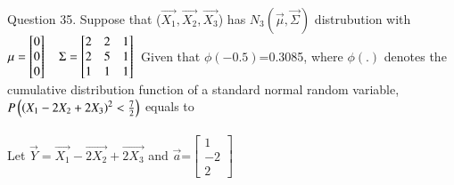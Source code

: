 \documentclass[journal,12pt,twocolumn]{IEEEtran}
\begin{document}



%
Question 35.
Suppose that ($\vec{X_1},\vec{X_2},\vec{X_3}$) has $N_3(\vec{\mu},\vec{\Sigma})$ distrubution with 
$\mu = \begin{bmatrix}
0 \\
0\\
0
\end{bmatrix} \quad  
\Sigma=\begin{bmatrix}
2 & 2 & 1 \\
2 & 5 & 1 \\
1 & 1 & 1
\end{bmatrix} \\ $ Given that $\phi(-0.5)$=0.3085, where $\phi(.)$ denotes the cumulative distribution function of a standard normal random variable, $P \left( \left(X_1-2X_2+2X_3\right)^2 < \frac{7}{2} \right)$ equals to \\
\fi
\solution \\
Let $\vec{Y} = \vec{X_1}-\vec{2X_2}+\vec{2X_3}$ and $\vec{a}$=$ \begin{bmatrix}
1 \\ -2 \\  2 
\end{bmatrix}$
\end{document}
